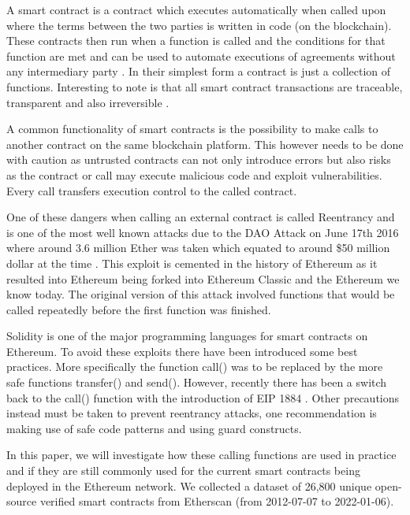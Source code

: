 \documentclass[10pt,conference]{IEEEtran}
\begin{document}
A smart contract is a contract which executes automatically when called upon where the terms between the two parties is written in code (on the blockchain). These contracts then run when a function is called and the conditions for that function are met and can be used to automate executions of agreements without any intermediary party \cite{criminal, 10.1145/2993600.2993611, smarter}. In their simplest form a contract is just a collection of functions. Interesting to note is that all smart contract transactions are traceable, transparent and also irreversible \cite{smart_inspect, smarter}.

A common functionality of smart contracts is the possibility to make calls to another contract on the same blockchain platform. This however needs to be done with caution as untrusted contracts can not only introduce errors but also risks as the contract or call may execute malicious code and exploit vulnerabilities. Every call transfers execution control to the called contract.

One of these dangers when calling an external contract is called Reentrancy and is one of the most well known attacks due to the DAO Attack on June 17th 2016 where around 3.6 million Ether was taken which equated to around \$50 million dollar at the time \cite{10.1007/978-3-662-54455-6_8}. This exploit is cemented in the history of Ethereum as it resulted into Ethereum being forked into Ethereum Classic and the Ethereum we know today. The original version of this attack involved functions that would be called repeatedly before the first function was finished. 

Solidity is one of the major programming languages for smart contracts on Ethereum. To avoid these exploits there have been introduced some best practices. More specifically the function call() was to be replaced by the more safe functions transfer() and send().  However, recently there has been a switch back to the call() function with the introduction of EIP 1884 \cite{eip1884}.  Other precautions instead must be taken to prevent reentrancy attacks, one recommendation is making use of safe code patterns and using guard constructs. 

In this paper, we will investigate how these calling functions are used in practice and if they are still commonly used for the current smart contracts being deployed in the Ethereum network.  We collected a dataset of 26,800 unique open-source verified smart contracts from Etherscan (from 2012-07-07 to 2022-01-06). 
\end{document}
